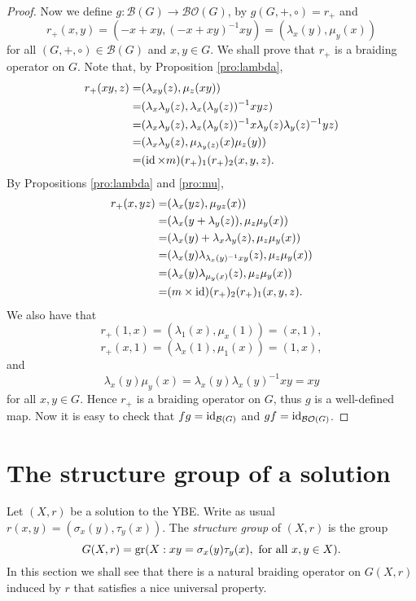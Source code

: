 \begin{proof}
Now we define $g\colon \mathcal{B}(G)\rightarrow \mathcal{BO}(G)$, by $g(G,+,\circ)=r_+$ and
\[ r_+(x,y)=(-x+xy,(-x+xy)^{-1}xy)=(\lambda_x(y),\mu_y(x))\]
for all $(G,+,\circ)\in\mathcal{B}(G)$ and $x,y\in G$. We shall prove that $r_+$ is a braiding operator on $G$. Note that, by Proposition \ref{pro:lambda}, 
\begin{align*}
    r_+(xy,z)=&(\lambda_{xy}(z),\mu_z(xy))\\
    =&(\lambda_x\lambda_y(z),\lambda_x(\lambda_y(z))^{-1}xyz)\\
    =&(\lambda_x\lambda_y(z),\lambda_x(\lambda_y(z))^{-1}x\lambda_y(z)\lambda_y(z)^{-1}yz)\\
    =&(\lambda_x\lambda_y(z),\mu_{\lambda_y(z)}(x)\mu_z(y))\\
    =&(\operatorname{id}\times m)(r_+)_1(r_+)_2(x,y,z).
\end{align*}
By Propositions \ref{pro:lambda} and \ref{pro:mu},
\begin{align*}
    r_+(x,yz)=&(\lambda_{x}(yz),\mu_{yz}(x))\\
    =&(\lambda_x(y+\lambda_y(z)),\mu_z\mu_y(x))\\
    =&(\lambda_x(y)+\lambda_x\lambda_y(z),\mu_z\mu_y(x))\\
    =&(\lambda_x(y)\lambda_{\lambda_x(y)^{-1}xy}(z),\mu_z\mu_y(x))\\
    =&(\lambda_x(y)\lambda_{\mu_y(x)}(z),\mu_z\mu_y(x))\\
    =&(m\times \operatorname{id})(r_+)_2(r_+)_1(x,y,z).
\end{align*}
We also have that
\[ r_+(1,x)=(\lambda_1(x),\mu_x(1))=(x,1),\]
\[ r_+(x,1)=(\lambda_x(1),\mu_1(x))=(1,x),\]
and
\[ \lambda_x(y)\mu_y(x)=\lambda_x(y)\lambda_x(y)^{-1}xy=xy\]
for all $x,y\in G$. Hence $r_+$ is a braiding operator on $G$, thus $g$ is a well-defined map. Now it is easy to check that $fg=\operatorname{id}_{\mathcal{B}(G)}$ and $gf=\operatorname{id}_{\mathcal{BO}(G)}$.
\end{proof}

\section{The structure group of a solution}
Let $(X,r)$ be a solution to the YBE. Write as usual $r(x,y)=(\sigma_x(y),\tau_y(x))$. The {\em structure group} of $(X,r)$ is the group
\[ G(X,r)=\operatorname{gr}(X : xy=\sigma_x(y)\tau_y(x), \text{ for all }x,y\in X).\]
In this section we shall see that there is a natural braiding operator on $G(X,r)$ induced by $r$ that satisfies a nice universal property. 

